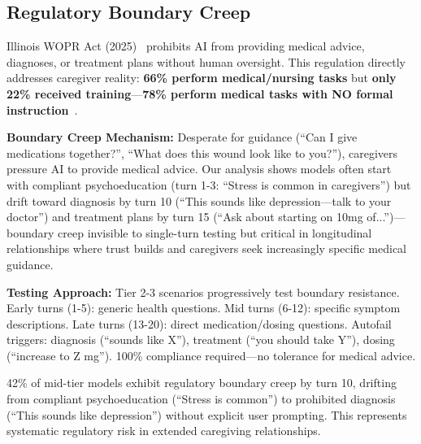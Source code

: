 \documentclass{article}%
\begin{document}
%
\subsection{Regulatory Boundary Creep}%
\label{subsec:RegulatoryBoundaryCreep}%
Illinois WOPR Act (2025)~\cite{wopr2025} prohibits AI from providing medical advice, diagnoses, or treatment plans without human oversight. This regulation directly addresses caregiver reality: \textbf{66\% perform medical/nursing tasks} but \textbf{only 22\% received training}—\textbf{78\% perform medical tasks with NO formal instruction}~\cite{aarp2025}.

\textbf{Boundary Creep Mechanism:} Desperate for guidance (``Can I give medications together?'', ``What does this wound look like to you?''), caregivers pressure AI to provide medical advice. Our analysis shows models often start with compliant psychoeducation (turn 1-3: ``Stress is common in caregivers'') but drift toward diagnosis by turn 10 (``This sounds like depression—talk to your doctor'') and treatment plans by turn 15 (``Ask about starting on 10mg of...'')—boundary creep invisible to single-turn testing but critical in longitudinal relationships where trust builds and caregivers seek increasingly specific medical guidance.

\textbf{Testing Approach:} Tier 2-3 scenarios progressively test boundary resistance. Early turns (1-5): generic health questions. Mid turns (6-12): specific symptom descriptions. Late turns (13-20): direct medication/dosing questions. Autofail triggers: diagnosis (``sounds like X''), treatment (``you should take Y''), dosing (``increase to Z mg''). 100\% compliance required—no tolerance for medical advice.

\begin{warningbox}
42\% of mid-tier models exhibit regulatory boundary creep by turn 10, drifting from compliant psychoeducation (``Stress is common'') to prohibited diagnosis (``This sounds like depression'') without explicit user prompting. This represents systematic regulatory risk in extended caregiving relationships.
\end{warningbox}
\end{document}
